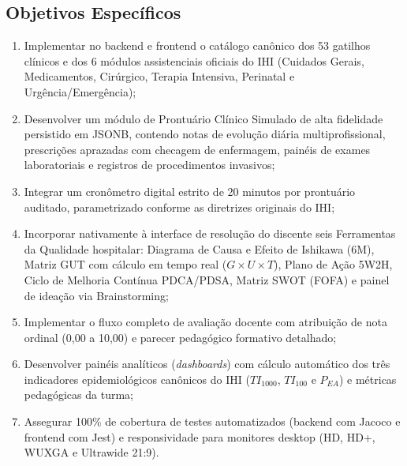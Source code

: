 \subsection{Objetivos Específicos}
\begin{enumerate}
    \item Implementar no backend e frontend o catálogo canônico dos 53 gatilhos clínicos e dos 6 módulos assistenciais oficiais do IHI (Cuidados Gerais, Medicamentos, Cirúrgico, Terapia Intensiva, Perinatal e Urgência/Emergência);
    \item Desenvolver um módulo de Prontuário Clínico Simulado de alta fidelidade persistido em JSONB, contendo notas de evolução diária multiprofissional, prescrições aprazadas com checagem de enfermagem, painéis de exames laboratoriais e registros de procedimentos invasivos;
    \item Integrar um cronômetro digital estrito de 20 minutos por prontuário auditado, parametrizado conforme as diretrizes originais do IHI;
    \item Incorporar nativamente à interface de resolução do discente seis Ferramentas da Qualidade hospitalar: Diagrama de Causa e Efeito de Ishikawa (6M), Matriz GUT com cálculo em tempo real ($G \times U \times T$), Plano de Ação 5W2H, Ciclo de Melhoria Contínua PDCA/PDSA, Matriz SWOT (FOFA) e painel de ideação via Brainstorming;
    \item Implementar o fluxo completo de avaliação docente com atribuição de nota ordinal (0,00 a 10,00) e parecer pedagógico formativo detalhado;
    \item Desenvolver painéis analíticos (\textit{dashboards}) com cálculo automático dos três indicadores epidemiológicos canônicos do IHI ($TI_{1000}$, $TI_{100}$ e $P_{EA}$) e métricas pedagógicas da turma;
    \item Assegurar 100\% de cobertura de testes automatizados (backend com Jacoco e frontend com Jest) e responsividade para monitores desktop (HD, HD+, WUXGA e Ultrawide 21:9).
\end{enumerate}